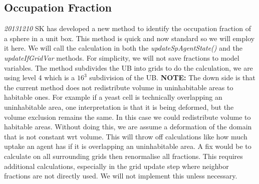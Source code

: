 \documentclass{article}
\begin{document}
\subsection{Occupation Fraction}
\emph{20131210}
SK has developed a new method to identify the occupation fraction of a sphere in a unit box.
This method is quick and now standard so we will employ it here.
We will call the calculation in both the \textit{updateSpAgentState()} and the \textit{updateIfGridVar} methods.
For simplicity, we will not save fractions to model variables.
The method subdivides the UB into grids to do the calculation,
we are using level 4 which is a $16^3$ subdivision of the UB. 
\textbf{NOTE:} The down side is that the current method does not redistribute volume 
in uninhabitable areas to habitable ones.
For example if a yeast cell is technically overlapping an uninhabitable area,
one interpretation is that it is being deformed, but the volume exclusion remains the same.
In this case we could redistribute volume to habitable areas.  
Without doing this, we are assume a deformation of the domain that is not constant wrt volume.
This will throw off calculations like how much uptake an agent has if it is overlapping an uninhabitable area.
A fix would be to calculate on all surrounding grids then renormalise all fractions.
This requires additional calculations, 
especially in the grid update step where neighbor fractions are not directly used.
We will not implement this unless necessary.
\end{document}
